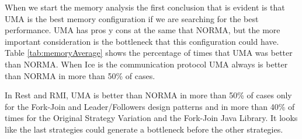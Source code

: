 When we start the memory analysis the first conclusion that is evident is that UMA is the best memory configuration if we are searching for the best performance. UMA has pros y cons at the same that NORMA, but the more important consideration is the bottleneck that this configuration could have. Table \ref{tab:memoryAverage} shows the percentage of times that UMA was better than NORMA. When Ice is the communication protocol UMA always is better than NORMA in more than 50\% of cases.  

In Rest and RMI, UMA is better than NORMA in more than 50\% of cases only for the Fork-Join and Leader/Followers design patterns and in more than 40\% of times for the Original Strategy Variation and the Fork-Join Java Library. It looks like the last strategies could generate a bottleneck before the other strategies.


